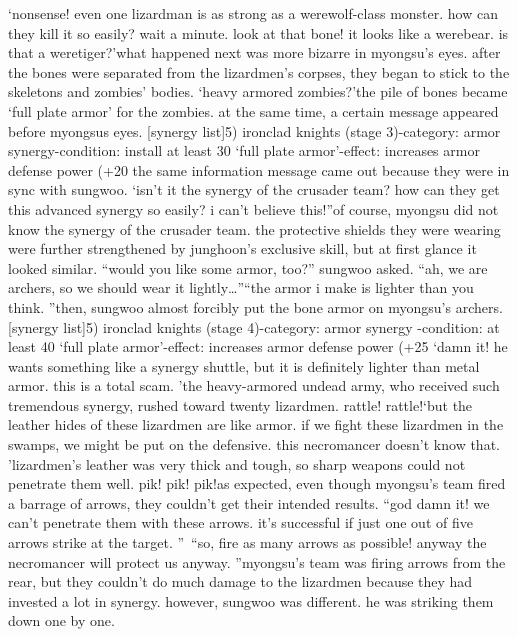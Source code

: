 ‘nonsense! even one lizardman is as strong as a werewolf-class monster.
 how can they kill it so easily? wait a minute.
 look at that bone! it looks like a werebear.
 is that a weretiger?’what happened next was more bizarre in myongsu’s eyes.
 after the bones were separated from the lizardmen’s corpses, they began to stick to the skeletons and zombies’ bodies.
‘heavy armored zombies?’the pile of bones became ‘full plate armor’ for the zombies.
at the same time, a certain message appeared before myongsus eyes.
[synergy list]5) ironclad knights (stage 3)-category: armor synergy-condition: install at least 30 ‘full plate armor’-effect: increases armor defense power (+20%
the same information message came out because they were in sync with sungwoo.
‘isn’t it the synergy of the crusader team? how can they get this advanced synergy so easily? i can’t believe this!”of course, myongsu did not know the synergy of the crusader team.
the protective shields they were wearing were further strengthened by junghoon’s exclusive skill, but at first glance it looked similar.
“would you like some armor, too?” sungwoo asked.
“ah, we are archers, so we should wear it lightly…”“the armor i make is lighter than you think.
”then, sungwoo almost forcibly put the bone armor on myongsu’s archers.
[synergy list]5) ironclad knights (stage 4)-category: armor synergy
-condition: at least 40 ‘full plate armor’-effect: increases armor defense power (+25%
‘damn it! he wants something like a synergy shuttle, but it is definitely lighter than metal armor.
 this is a total scam.
’the heavy-armored undead army, who received such tremendous synergy, rushed toward twenty lizardmen.
rattle! rattle!‘but the leather hides of these lizardmen are like armor.
 if we fight these lizardmen in the swamps, we might be put on the defensive.
 this necromancer doesn’t know that.
’lizardmen’s leather was very thick and tough, so sharp weapons could not penetrate them well.
pik! pik! pik!as expected, even though myongsu’s team fired a barrage of arrows, they couldn’t get their intended results.
“god damn it! we can’t penetrate them with these arrows.
 it’s successful if just one out of five arrows strike at the target.
” “so, fire as many arrows as possible! anyway the necromancer will protect us anyway.
”myongsu’s team was firing arrows from the rear, but they couldn’t do much damage to the lizardmen because they had invested a lot in synergy.
however, sungwoo was different.
 he was striking them down one by one.
